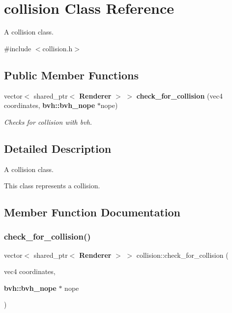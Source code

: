 \section{collision Class Reference}
\label{classcollision}


A collision class.  




{\ttfamily \#include $<$collision.\+h$>$}

\subsection*{Public Member Functions}
\begin{DoxyCompactItemize}
\item 
vector$<$ shared\+\_\+ptr$<$ \textbf{ Renderer} $>$ $>$ \textbf{ check\+\_\+for\+\_\+collision} (vec4 coordinates, \textbf{ bvh\+::bvh\+\_\+nope} $\ast$nope)
\begin{DoxyCompactList}\small\item\em Checks for collision with bvh. \end{DoxyCompactList}\end{DoxyCompactItemize}


\subsection{Detailed Description}
A collision class. 

This class represents a collision. 

\subsection{Member Function Documentation}
\mbox{\label{classcollision_ac3d0461ac65c85ab80a7cddd0d63785b}} 
\subsubsection{check\_for\_collision()}
{\footnotesize\ttfamily vector$<$ shared\+\_\+ptr$<$ \textbf{ Renderer} $>$ $>$ collision\+::check\+\_\+for\+\_\+collision (\begin{DoxyParamCaption}\item[{vec4}]{coordinates,  }\item[{\textbf{ bvh\+::bvh\+\_\+nope} $\ast$}]{nope }\end{DoxyParamCaption})}




